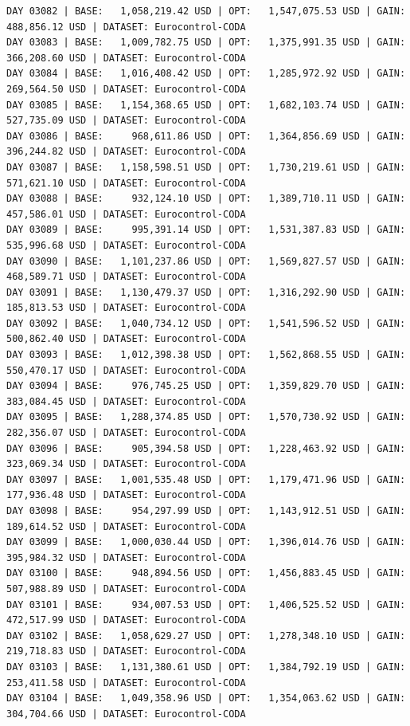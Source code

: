 \documentclass[11pt,a4paper]{article}
\begin{document}
\begin{verbatim}
DAY 03082 | BASE:   1,058,219.42 USD | OPT:   1,547,075.53 USD | GAIN: 488,856.12 USD | DATASET: Eurocontrol-CODA
DAY 03083 | BASE:   1,009,782.75 USD | OPT:   1,375,991.35 USD | GAIN: 366,208.60 USD | DATASET: Eurocontrol-CODA
DAY 03084 | BASE:   1,016,408.42 USD | OPT:   1,285,972.92 USD | GAIN: 269,564.50 USD | DATASET: Eurocontrol-CODA
DAY 03085 | BASE:   1,154,368.65 USD | OPT:   1,682,103.74 USD | GAIN: 527,735.09 USD | DATASET: Eurocontrol-CODA
DAY 03086 | BASE:     968,611.86 USD | OPT:   1,364,856.69 USD | GAIN: 396,244.82 USD | DATASET: Eurocontrol-CODA
DAY 03087 | BASE:   1,158,598.51 USD | OPT:   1,730,219.61 USD | GAIN: 571,621.10 USD | DATASET: Eurocontrol-CODA
DAY 03088 | BASE:     932,124.10 USD | OPT:   1,389,710.11 USD | GAIN: 457,586.01 USD | DATASET: Eurocontrol-CODA
DAY 03089 | BASE:     995,391.14 USD | OPT:   1,531,387.83 USD | GAIN: 535,996.68 USD | DATASET: Eurocontrol-CODA
DAY 03090 | BASE:   1,101,237.86 USD | OPT:   1,569,827.57 USD | GAIN: 468,589.71 USD | DATASET: Eurocontrol-CODA
DAY 03091 | BASE:   1,130,479.37 USD | OPT:   1,316,292.90 USD | GAIN: 185,813.53 USD | DATASET: Eurocontrol-CODA
DAY 03092 | BASE:   1,040,734.12 USD | OPT:   1,541,596.52 USD | GAIN: 500,862.40 USD | DATASET: Eurocontrol-CODA
DAY 03093 | BASE:   1,012,398.38 USD | OPT:   1,562,868.55 USD | GAIN: 550,470.17 USD | DATASET: Eurocontrol-CODA
DAY 03094 | BASE:     976,745.25 USD | OPT:   1,359,829.70 USD | GAIN: 383,084.45 USD | DATASET: Eurocontrol-CODA
DAY 03095 | BASE:   1,288,374.85 USD | OPT:   1,570,730.92 USD | GAIN: 282,356.07 USD | DATASET: Eurocontrol-CODA
DAY 03096 | BASE:     905,394.58 USD | OPT:   1,228,463.92 USD | GAIN: 323,069.34 USD | DATASET: Eurocontrol-CODA
DAY 03097 | BASE:   1,001,535.48 USD | OPT:   1,179,471.96 USD | GAIN: 177,936.48 USD | DATASET: Eurocontrol-CODA
DAY 03098 | BASE:     954,297.99 USD | OPT:   1,143,912.51 USD | GAIN: 189,614.52 USD | DATASET: Eurocontrol-CODA
DAY 03099 | BASE:   1,000,030.44 USD | OPT:   1,396,014.76 USD | GAIN: 395,984.32 USD | DATASET: Eurocontrol-CODA
DAY 03100 | BASE:     948,894.56 USD | OPT:   1,456,883.45 USD | GAIN: 507,988.89 USD | DATASET: Eurocontrol-CODA
DAY 03101 | BASE:     934,007.53 USD | OPT:   1,406,525.52 USD | GAIN: 472,517.99 USD | DATASET: Eurocontrol-CODA
DAY 03102 | BASE:   1,058,629.27 USD | OPT:   1,278,348.10 USD | GAIN: 219,718.83 USD | DATASET: Eurocontrol-CODA
DAY 03103 | BASE:   1,131,380.61 USD | OPT:   1,384,792.19 USD | GAIN: 253,411.58 USD | DATASET: Eurocontrol-CODA
DAY 03104 | BASE:   1,049,358.96 USD | OPT:   1,354,063.62 USD | GAIN: 304,704.66 USD | DATASET: Eurocontrol-CODA

\end{verbatim}
\end{document}
